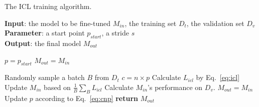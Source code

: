 \begin{algorithm}[tb]
	\caption{The ICL training algorithm.}
	\label{alg:picl}
	\small
	\textbf{Input}: the model to be fine-tuned $M_{in}$, the training set $D_t$, the validation set $D_v$\\
	\textbf{Parameter}: a start point $p_{start}$, a stride $s$\\
	\textbf{Output}: the final model $M_{out}$
	\begin{algorithmic}[1] %
		\State $p = p_{start}$ 
		\State $M_{out}=M_{in}$ 
			
			\State {}
				\State Randomly sample a batch $B$ from $D_t$
					\State $c = n\times p$
					\State Calculate $L_{icl}$ by Eq.~\ref{eq:icl}
				\EndFor
				\State Update $M_{in}$ based on $\frac{1}{B}\sum_{B}L_{icl}$
			\EndFor
			\State {}
			\State Calculate $M_{in}$'s performance on $D_v$.
				\State $M_{out} = M_{in}$
			\Else
				\State Update $p$ according to Eq.~\ref{eq:cnp}
			\EndIf
		\EndFor	
		\State \textbf{return} $M_{out}$
	
		\EndProcedure
	\end{algorithmic}

\end{algorithm}

